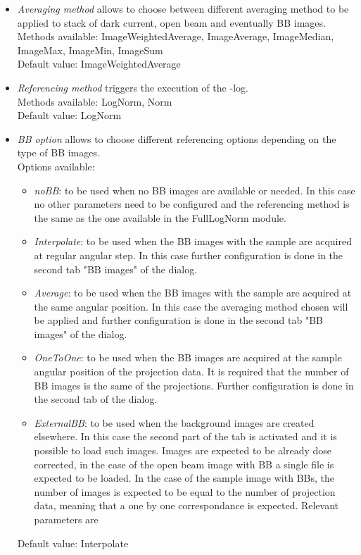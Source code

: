 \documentclass[a4paper]{scrreprt}
\begin{document}
\begin{itemize}
\item \textit{Averaging method} allows to choose between different averaging method to be applied to stack of dark current, open beam and eventually BB images.  \\ Methods available: ImageWeightedAverage, ImageAverage, ImageMedian, ImageMax, ImageMin, ImageSum \\ Default value: ImageWeightedAverage
\item \textit{Referencing method} triggers the execution of the -log. \\ Methods available: LogNorm, Norm\\ Default value: LogNorm
\item \textit{BB option} allows to choose different referencing options depending on the type of BB images. 
\\ Options available: 
\begin{itemize}
\item \textit{noBB}: to be used when no BB images are available or needed. In this case no other parameters need to be configured and the referencing method is the same as the one available in the FullLogNorm module. 
\item \textit{Interpolate}: to be used when the BB images with the sample are acquired at regular angular step. In this case further configuration is done in the second tab "BB images" of the dialog.
\item \textit{Average}: to be used when the BB images with the sample are acquired at the same angular position. In this case the averaging method chosen will be applied and further configuration is done in the second tab "BB images" of the dialog. 
\item \textit{OneToOne}: to be used when the BB images are acquired at the sample angular position of the projection data. It is required that the number of BB images is the same of the projections. Further configuration is done in the second tab of the dialog. 
\item \textit{ExternalBB}: to be used when the background images are created elsewhere. In this case the second part of the tab is activated and it is possible to load such images. Images are expected to be already dose corrected, in the case of the open beam image with BB a single file is expected to be loaded. In the case of the sample image with BBs, the number of images is expected to be equal to the number of projection data, meaning that a one by one correspondance is expected. Relevant parameters are 
\end{itemize}
Default value: Interpolate
\end{itemize}
\end{document}
